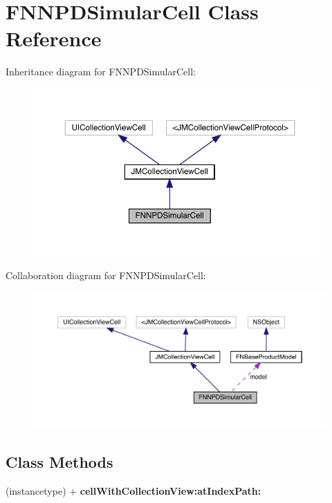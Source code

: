 \hypertarget{interface_f_n_n_p_d_simular_cell}{}\section{F\+N\+N\+P\+D\+Simular\+Cell Class Reference}
\label{interface_f_n_n_p_d_simular_cell}


Inheritance diagram for F\+N\+N\+P\+D\+Simular\+Cell\+:\nopagebreak
\begin{figure}[H]
\begin{center}
\leavevmode
\includegraphics[width=350pt]{interface_f_n_n_p_d_simular_cell__inherit__graph}
\end{center}
\end{figure}


Collaboration diagram for F\+N\+N\+P\+D\+Simular\+Cell\+:\nopagebreak
\begin{figure}[H]
\begin{center}
\leavevmode
\includegraphics[width=350pt]{interface_f_n_n_p_d_simular_cell__coll__graph}
\end{center}
\end{figure}
\subsection*{Class Methods}
\begin{DoxyCompactItemize}
\item 
\mbox{\label{interface_f_n_n_p_d_simular_cell_a594f5ae47d8a98c8529c8c38eb3334f5}} 
(instancetype) + {\bfseries cell\+With\+Collection\+View\+:at\+Index\+Path\+:}
\end{DoxyCompactItemize}
